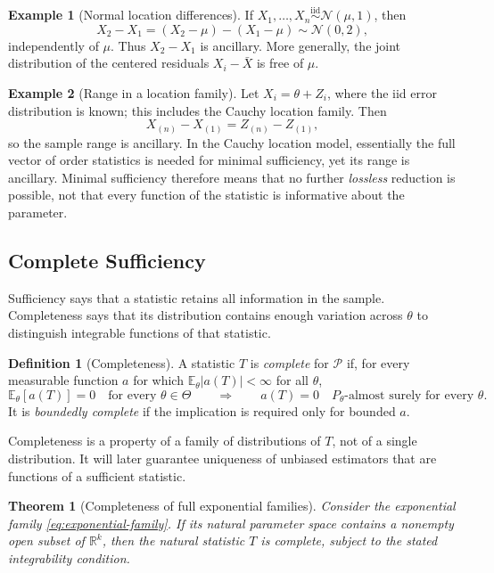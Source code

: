 \documentclass[12pt,oneside]{book}
\numberwithin{equation}{section}
\theoremstyle{definition}
\newtheorem{definition}{Definition}[section]
\newtheorem{example}{Example}[section]
\theoremstyle{plain}
\newtheorem{theorem}{Theorem}[section]
\theoremstyle{remark}
\newcommand{\R}{\mathbb{R}}
\newcommand{\E}{\mathbb{E}}
\newcommand{\iid}{\overset{\text{iid}}{\sim}}
\newcommand{\abs}[1]{\left\lvert #1 \right\rvert}
\newcommand{\Normal}{\mathcal{N}}
\begin{document}
\begin{example}[Normal location differences]
If $X_1,\ldots,X_n\iid\Normal(\mu,1)$, then
\[
 X_2-X_1=(X_2-\mu)-(X_1-\mu)\sim\Normal(0,2),
\]
independently of $\mu$. Thus $X_2-X_1$ is ancillary. More generally, the
joint distribution of the centered residuals $X_i-\bar X$ is free of $\mu$.
\end{example}

\begin{example}[Range in a location family]
Let $X_i=\theta+Z_i$, where the iid error distribution is known; this
includes the Cauchy location family. Then
\[
 X_{(n)}-X_{(1)}=Z_{(n)}-Z_{(1)},
\]
so the sample range is ancillary. In the Cauchy location model, essentially
the full vector of order statistics is needed for minimal sufficiency, yet
its range is ancillary. Minimal sufficiency therefore means that no further
\emph{lossless} reduction is possible, not that every function of the
statistic is informative about the parameter.
\end{example}

\subsection{Complete Sufficiency}

Sufficiency says that a statistic retains all information in the sample.
Completeness says that its distribution contains enough variation across
$\theta$ to distinguish integrable functions of that statistic.

\begin{definition}[Completeness]
A statistic $T$ is \emph{complete} for $\mathcal P$ if, for every measurable
function $a$ for which $\E_\theta\abs{a(T)}<\infty$ for all $\theta$,
\[
    \E_\theta[a(T)]=0\quad\text{for every }\theta\in\Theta
    \qquad\Longrightarrow\qquad
    a(T)=0\quad P_\theta\text{-almost surely for every }\theta.
\]
It is \emph{boundedly complete} if the implication is required only for
bounded $a$.
\end{definition}

Completeness is a property of a family of distributions of $T$, not of a
single distribution.  It will later guarantee uniqueness of unbiased
estimators that are functions of a sufficient statistic.

\begin{theorem}[Completeness of full exponential families]
Consider the exponential family \eqref{eq:exponential-family}.  If its natural
parameter space contains a nonempty open subset of $\R^k$, then the natural
statistic $T$ is complete, subject to the stated integrability condition.
\end{theorem}
\end{document}
